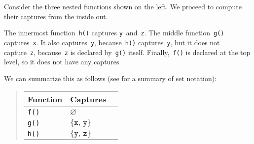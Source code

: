 \documentclass[../generics]{subfiles}
\begin{document}
Consider the three nested functions shown on the left. We proceed to compute their captures from the inside out.

The innermost function~\texttt{h()} captures \texttt{y}~and~\texttt{z}. The middle function~\texttt{g()} captures~\texttt{x}. It also captures~\texttt{y}, because~\texttt{h()} captures~\texttt{y}, but it does not capture~\texttt{z}, because~\texttt{z} is declared by~\texttt{g()} itself. Finally,~\texttt{f()} is declared at the top level, so it does not have any captures.

We can summarize this as follows (see  for a summary of set notation):
\begin{quote}
\qquad\qquad
\begin{tabular}{lll}
\toprule
\textbf{Function}&\textbf{Captures}\\
\midrule
\texttt{f()}&$\varnothing$\\
\texttt{g()}&$\{\texttt{x},\,\texttt{y}\}$\\
\texttt{h()}&$\{\texttt{y},\,\texttt{z}\}$\\
\bottomrule
\end{tabular}
\end{quote}

\bigskip
\end{document}
